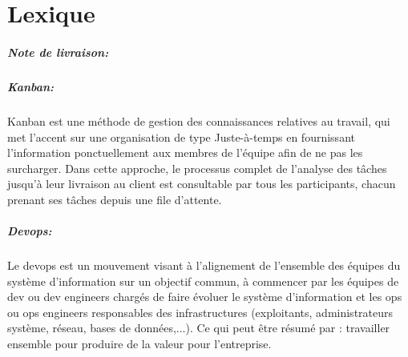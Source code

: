 \chapter*{Lexique}
\label{chap:Lexique}

\paragraph{Note de livraison: }

\paragraph{Kanban: } Kanban est une méthode de gestion des connaissances relatives au travail, qui met l’accent sur une organisation de type Juste-à-temps en fournissant l'information ponctuellement aux membres de l'équipe afin de ne pas les surcharger. Dans cette approche, le processus complet de l'analyse des tâches jusqu’à leur livraison au client est consultable par tous les participants, chacun prenant ses tâches depuis une file d'attente.

\paragraph{Devops: } Le devops est un mouvement visant à l'alignement de l'ensemble des équipes du système d'information sur un objectif commun, à commencer par les équipes de dev ou dev engineers chargés de faire évoluer le système d'information et les ops ou ops engineers responsables des infrastructures (exploitants, administrateurs système, réseau, bases de données,...). Ce qui peut être résumé par : travailler ensemble pour produire de la valeur pour l'entreprise.
